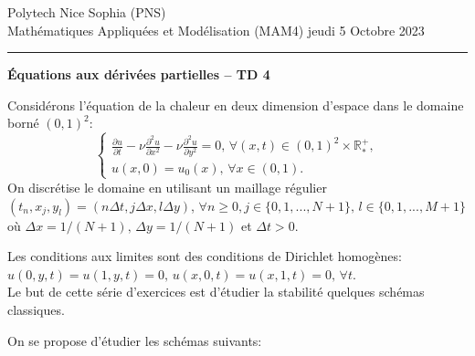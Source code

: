 \documentclass[12pt,a4paper]{article}
\begin{document}
 \hfill Polytech Nice Sophia (PNS)\\
\noindent Math\'ematiques Appliqu\'ees et Mod\'elisation (MAM4) \hfill jeudi 5 Octobre 2023 \\

\hrule

\bigskip
\bigskip

\begin{center}{\bf \'Equations aux d\'eriv\'ees partielles --
TD 4}\end{center}

\bigskip

\parskip 12pt
\noindent Consid\'erons l'\'equation de la chaleur en deux dimension d'espace dans le domaine born\'e $(0,1)^2$:
$$
\begin{cases}
\displaystyle\frac{\partial u}{\partial t}-\nu \frac{\partial^2 u}{\partial x^2}-\nu \frac{\partial^2 u}{\partial y^2}=0,\, \forall (x,t)\in(0,1)^2\times\mathbb{R}^+_*,\\[2ex]
u(x,0)=u_0(x),\,\forall x\in (0,1).
\end{cases}
$$
On discr\'etise le domaine en utilisant un maillage r\'egulier
$(t_n,x_j,y_l)=(n\Delta t,j\Delta x,l\Delta y)$,  $\forall n\ge 0,
j\in\{0,1,...,N+1\},\, l\in\{0,1,...,M+1\}$ o\`u $\Delta x=1/(N+1),\, \Delta y=1/(N+1)$ et $\Delta t>0$. 

\noindent Les conditions aux limites sont des conditions de Dirichlet homogènes:
$u(0,y,t)=u(1,y,t)=0,\,u(x,0,t)=u(x,1,t)=0,\,\forall t$. \\

\noindent Le but de cette s\'erie d'exercices est d'étudier la stabilité quelques sch\'emas classiques. 


\noindent On se propose d'\'etudier les sch\'emas suivants:
\end{document}

